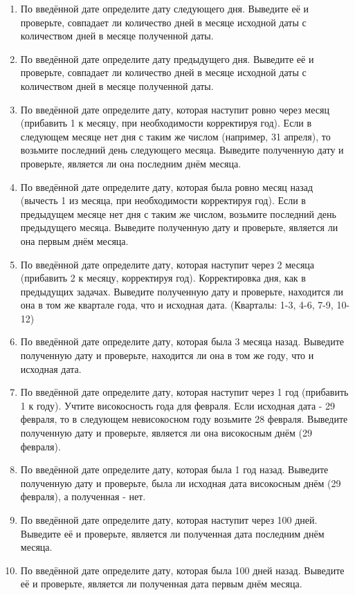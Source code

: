 \begin{enumerate}
    \item По введённой дате определите дату следующего дня. Выведите её и проверьте, совпадает ли количество дней в месяце исходной даты с количеством дней в месяце полученной даты.
    \item По введённой дате определите дату предыдущего дня. Выведите её и проверьте, совпадает ли количество дней в месяце исходной даты с количеством дней в месяце полученной даты.
    \item По введённой дате определите дату, которая наступит ровно через месяц (прибавить 1 к месяцу, при необходимости корректируя год). Если в следующем месяце нет дня с таким же числом (например, 31 апреля), то возьмите последний день следующего месяца. Выведите полученную дату и проверьте, является ли она последним днём месяца.
    \item По введённой дате определите дату, которая была ровно месяц назад (вычесть 1 из месяца, при необходимости корректируя год). Если в предыдущем месяце нет дня с таким же числом, возьмите последний день предыдущего месяца. Выведите полученную дату и проверьте, является ли она первым днём месяца.
    \item По введённой дате определите дату, которая наступит через 2 месяца (прибавить 2 к месяцу, корректируя год). Корректировка дня, как в предыдущих задачах. Выведите полученную дату и проверьте, находится ли она в том же квартале года, что и исходная дата. (Кварталы: 1-3, 4-6, 7-9, 10-12)
    \item По введённой дате определите дату, которая была 3 месяца назад. Выведите полученную дату и проверьте, находится ли она в том же году, что и исходная дата.
    \item По введённой дате определите дату, которая наступит через 1 год (прибавить 1 к году). Учтите високосность года для февраля. Если исходная дата - 29 февраля, то в следующем невисокосном году возьмите 28 февраля. Выведите полученную дату и проверьте, является ли она високосным днём (29 февраля).
    \item По введённой дате определите дату, которая была 1 год назад. Выведите полученную дату и проверьте, была ли исходная дата високосным днём (29 февраля), а полученная - нет.
    \item По введённой дате определите дату, которая наступит через 100 дней. Выведите её и проверьте, является ли полученная дата последним днём месяца.
    \item По введённой дате определите дату, которая была 100 дней назад. Выведите её и проверьте, является ли полученная дата первым днём месяца.

\end{enumerate}
